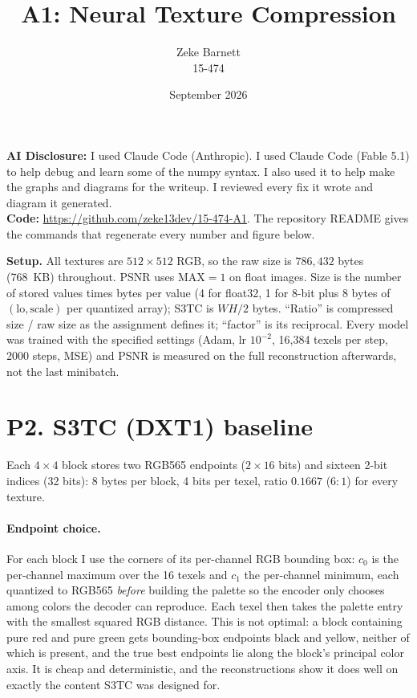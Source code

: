 \documentclass[11pt]{article}
\title{A1: Neural Texture Compression}
\author{Zeke Barnett \\ 15-474}
\date{September 2026}
\begin{document}
\maketitle

\noindent\textbf{AI Disclosure:} I used Claude Code (Anthropic). I used Claude Code (Fable 5.1) to help debug and learn some of the numpy syntax. I also used it to help make the graphs and diagrams for the writeup. I reviewed every fix it wrote and diagram it generated. \\

\noindent\textbf{Code:} \url{https://github.com/zeke13dev/15-474-A1}. The repository README gives the commands that regenerate every number and figure below.

\medskip
\noindent\textbf{Setup.} All textures are $512\times512$ RGB, so the raw size is $786{,}432$ bytes (768~KB) throughout. PSNR uses $\mathrm{MAX}=1$ on float images. Size is the number of stored values times bytes per value (4 for float32, 1 for 8-bit plus 8 bytes of $(\text{lo},\text{scale})$ per quantized array); S3TC is $WH/2$ bytes. ``Ratio'' is compressed size / raw size as the assignment defines it; ``factor'' is its reciprocal. Every model was trained with the specified settings (Adam, lr $10^{-2}$, 16,384 texels per step, 2000 steps, MSE) and PSNR is measured on the full reconstruction afterwards, not the last minibatch.

\section*{P2. S3TC (DXT1) baseline}

Each $4\times4$ block stores two RGB565 endpoints ($2\times16$ bits) and sixteen 2-bit indices (32 bits): 8 bytes per block, 4 bits per texel, ratio $0.1667$ ($6{:}1$) for every texture.

\paragraph{Endpoint choice.} For each block I use the corners of its per-channel RGB bounding box: $c_0$ is the per-channel maximum over the 16 texels and $c_1$ the per-channel minimum, each quantized to RGB565 \emph{before} building the palette so the encoder only chooses among colors the decoder can reproduce. Each texel then takes the palette entry with the smallest squared RGB distance. This is not optimal: a block containing pure red and pure green gets bounding-box endpoints black and yellow, neither of which is present, and the true best endpoints lie along the block's principal color axis. It is cheap and deterministic, and the reconstructions show it does well on exactly the content S3TC was designed for.
\end{document}
